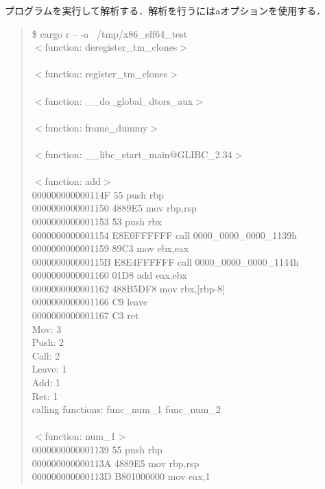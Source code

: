 \documentclass[12pt,a4paper,dvipdfmx]{jsarticle}
\begin{document}
プログラムを実行して解析する．解析を行うにはaオプションを使用する．
\begin{quote}
\$ cargo r -- -a ~/tmp/x86\_elf64\_test \\
$<$function: deregister\_tm\_clones$>$ \\
 \\
$<$function: register\_tm\_clones$>$ \\
 \\
$<$function: \_\_do\_global\_dtors\_aux$>$ \\
 \\
$<$function: frame\_dummy$>$ \\
 \\
$<$function: \_\_libc\_start\_main@GLIBC\_2.34$>$ \\
 \\
$<$function: add$>$ \\
000000000000114F 55                   push      rbp \\
0000000000001150 4889E5               mov       rbp,rsp \\
0000000000001153 53                   push      rbx \\
0000000000001154 E8E0FFFFFF           call      0000\_0000\_0000\_1139h \\
0000000000001159 89C3                 mov       ebx,eax \\
000000000000115B E8E4FFFFFF           call      0000\_0000\_0000\_1144h \\
0000000000001160 01D8                 add       eax,ebx \\
0000000000001162 488B5DF8             mov       rbx,[rbp-8] \\
0000000000001166 C9                   leave \\
0000000000001167 C3                   ret \\
Mov: 3 \\
Push: 2 \\
Call: 2 \\
Leave: 1 \\
Add: 1 \\
Ret: 1 \\
calling functions: func\_num\_1 func\_num\_2 \\
 \\
$<$function: num\_1$>$ \\
0000000000001139 55                   push      rbp \\
000000000000113A 4889E5               mov       rbp,rsp \\
000000000000113D B801000000           mov       eax,1 \\

\end{quote}
\end{document}
